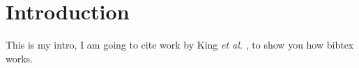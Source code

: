 \section{Introduction}

This is my intro, I am going to cite work by King \emph{et al.}
\cite{Dautenhahn}, to show you how bibtex works.
